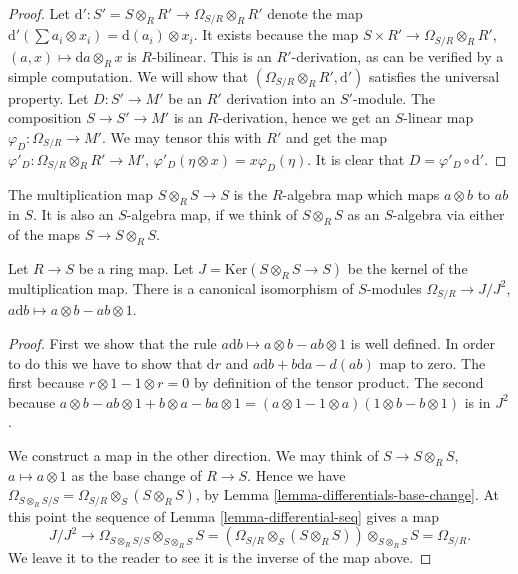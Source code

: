 \begin{proof}
Let $\text{d}' : S' = S\otimes_R R' \to \Omega_{S/R} \otimes_R R'$ denote the
map $\text{d}'( \sum a_i \otimes x_i ) = \text{d}(a_i) \otimes x_i$.
It exists because the map $S \times R' \to \Omega_{S/R} \otimes_R R'$,
$(a, x)\mapsto \text{d}a\otimes_R x$ is $R$-bilinear.
This is an $R'$-derivation, as can be verified by a simple computation.
We will show that $(\Omega_{S/R} \otimes_R R', \text{d}')$ satisfies
the universal property. Let $D : S' \to M'$ be an $R'$ derivation
into an $S'$-module. The composition $S \to S' \to M'$ is an $R$-derivation,
hence we get an $S$-linear map $\varphi_D : \Omega_{S/R} \to M'$. We may
tensor this with $R'$ and get the map $\varphi'_D :
\Omega_{S/R} \otimes_R R' \to M'$, $\varphi'_D(\eta \otimes x) =
x\varphi_D(\eta)$. It is clear that $D = \varphi'_D \circ \text{d}'$.
\end{proof}

\noindent
The multiplication map $S\otimes_R S \to S$ is the $R$-algebra
map which maps $a \otimes b$ to $ab$ in $S$. It is also an
$S$-algebra map, if we think of $S\otimes_R S$ as an $S$-algebra
via either of the maps $S \to S\otimes_R S$.

\begin{lemma}
\label{lemma-differentials-diagonal}
Let $R \to S$ be a ring map. Let $J = \text{Ker}(S\otimes_R S \to S)$
be the kernel of the multiplication map. There is a canonical
isomorphism of $S$-modules $\Omega_{S/R} \to J/J^2$,
$a \text{d} b \mapsto a\otimes b - ab\otimes 1$.
\end{lemma}

\begin{proof}
First we show that the rule $a \text{d} b \mapsto a\otimes b - ab\otimes 1$
is well defined. In order to do this we have to show
that $\text{d}r$ and $a\text{d}b + b \text{d}a - d(ab)$ map to zero.
The first because $r\otimes 1 - 1 \otimes r = 0$ by definition
of the tensor product. The second because
$a\otimes b - ab\otimes 1 + b\otimes a - ba\otimes 1
=
(a\otimes 1 - 1\otimes a)(1\otimes b - b\otimes 1)
$
is in $J^2$.

\medskip\noindent
We construct a map in the other direction.
We may think of $S \to S\otimes_R S$, $a \mapsto a\otimes 1$
as the base change of $R \to S$. Hence we have
$\Omega_{S\otimes_R S/S} = \Omega_{S/R} \otimes_S (S\otimes_R S)$,
by Lemma \ref{lemma-differentials-base-change}.
At this point the sequence of Lemma \ref{lemma-differential-seq} gives a map
$$
J/J^2  \to \Omega_{S\otimes_RS/ S} \otimes_{S\otimes_R S} S
= (\Omega_{S/R} \otimes_S (S\otimes_R S))\otimes_{S\otimes_R S} S
= \Omega_{S/R}.
$$
We leave it to the reader to see it is the inverse of the map
above.
\end{proof}





